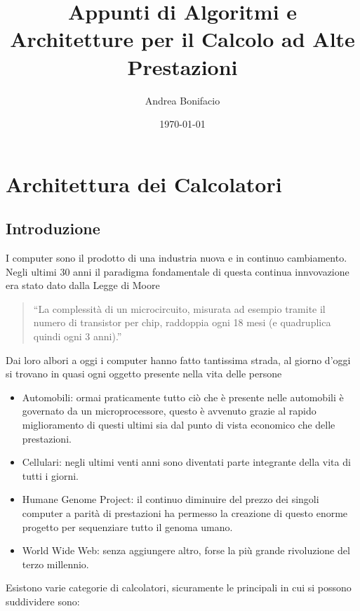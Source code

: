 \documentclass[a4paper,12pt]{article}
\theoremstyle{break}
\numberwithin{equation}{section}
\begin{document}
\title{Appunti di Algoritmi e Architetture per il Calcolo ad Alte Prestazioni}
\author{Andrea Bonifacio}
\date{\today}
\maketitle
\newpage
\section{Architettura dei Calcolatori}
\subsection{Introduzione}
I computer sono il prodotto di una industria nuova e in continuo cambiamento. Negli ultimi 30 anni il paradigma fondamentale di questa continua innvovazione era stato dato dalla Legge di Moore
\begin{quote}
    ``La complessità di un microcircuito, misurata ad esempio tramite il numero di transistor per chip, raddoppia ogni 18 mesi (e quadruplica quindi ogni 3 anni).'' 
\end{quote}
Dai loro albori a oggi i computer hanno fatto tantissima strada, al giorno d'oggi si trovano in quasi ogni oggetto presente nella vita delle persone
\begin{itemize}
    \item Automobili: ormai praticamente tutto ciò che è presente nelle automobili è governato da un microprocessore, questo è avvenuto grazie al rapido miglioramento di questi ultimi sia dal punto di vista economico che delle prestazioni.
    \item Cellulari: negli ultimi venti anni sono diventati parte integrante della vita di tutti i giorni.
    \item Humane Genome Project: il continuo diminuire del prezzo dei singoli computer a parità di prestazioni ha permesso la creazione di questo enorme progetto per sequenziare tutto il genoma umano.
    \item World Wide Web: senza aggiungere altro, forse la più grande rivoluzione del terzo millennio.
\end{itemize}
Esistono varie categorie di calcolatori, sicuramente le principali in cui si possono suddividere sono:
\end{document}
